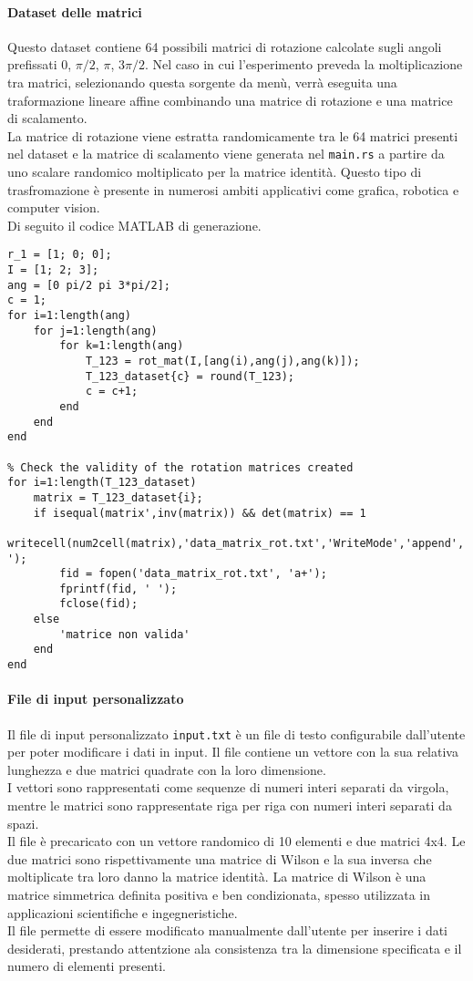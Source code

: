 \paragraph{Dataset delle matrici}
Questo dataset contiene 64 possibili matrici di rotazione calcolate sugli angoli prefissati 0, \(\pi/2\), \(\pi\), \(3\pi/2\).
Nel caso in cui l'esperimento preveda la moltiplicazione tra matrici, selezionando questa sorgente da menù, verrà eseguita una traformazione lineare affine combinando una matrice di rotazione e una matrice di scalamento.\\
La matrice di rotazione viene estratta randomicamente tra le 64 matrici presenti nel dataset e la matrice di scalamento viene generata nel \texttt{main.rs} a partire da uno scalare randomico moltiplicato per la matrice identità.
Questo tipo di trasfromazione è presente in numerosi ambiti applicativi come grafica, robotica e computer vision.\\
Di seguito il codice MATLAB di generazione.

\begin{verbatim}
r_1 = [1; 0; 0];
I = [1; 2; 3];
ang = [0 pi/2 pi 3*pi/2];
c = 1;
for i=1:length(ang)
    for j=1:length(ang)
        for k=1:length(ang) 
            T_123 = rot_mat(I,[ang(i),ang(j),ang(k)]);
            T_123_dataset{c} = round(T_123);
            c = c+1;
        end
    end
end

% Check the validity of the rotation matrices created
for i=1:length(T_123_dataset)
    matrix = T_123_dataset{i};
    if isequal(matrix',inv(matrix)) && det(matrix) == 1
        writecell(num2cell(matrix),'data_matrix_rot.txt','WriteMode','append','Delimiter',' ');
        fid = fopen('data_matrix_rot.txt', 'a+');
        fprintf(fid, ' ');
        fclose(fid);
    else
        'matrice non valida'
    end
end
\end{verbatim}

\paragraph{File di input personalizzato}
Il file di input personalizzato \texttt{input.txt} è un file di testo configurabile dall'utente per poter modificare i dati in input. Il file contiene un vettore con la sua relativa lunghezza e due matrici quadrate con la loro dimensione. \\
I vettori sono rappresentati come sequenze di numeri interi separati da virgola, mentre le matrici sono rappresentate riga per riga con numeri interi separati da spazi.\\
Il file è precaricato con un vettore randomico di 10 elementi e due matrici 4x4. Le due matrici sono rispettivamente una matrice di Wilson e la sua inversa che moltiplicate tra loro danno la matrice identità. La matrice di Wilson è una matrice simmetrica definita positiva e ben condizionata, spesso utilizzata in applicazioni scientifiche e ingegneristiche. \\
Il file permette di essere modificato manualmente dall'utente per inserire i dati desiderati, prestando attentzione ala consistenza tra la dimensione specificata e il numero di elementi presenti.\\

